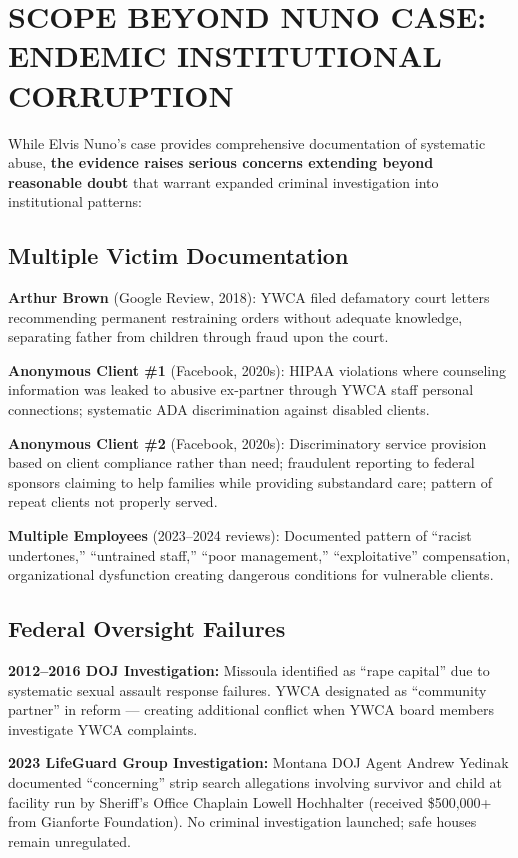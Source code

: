 \documentclass[12pt,oneside]{article}
\begin{document}
\section*{SCOPE BEYOND NUNO CASE: ENDEMIC INSTITUTIONAL CORRUPTION}

While Elvis Nuno's case provides comprehensive documentation of systematic abuse, \textbf{the evidence raises serious concerns extending beyond reasonable doubt} that warrant expanded criminal investigation into institutional patterns:

\subsection*{Multiple Victim Documentation}

\textbf{Arthur Brown} (Google Review, 2018): YWCA filed defamatory court letters recommending permanent restraining orders without adequate knowledge, separating father from children through fraud upon the court.

\textbf{Anonymous Client \#1} (Facebook, 2020s): HIPAA violations where counseling information was leaked to abusive ex-partner through YWCA staff personal connections; systematic ADA discrimination against disabled clients.

\textbf{Anonymous Client \#2} (Facebook, 2020s): Discriminatory service provision based on client compliance rather than need; fraudulent reporting to federal sponsors claiming to help families while providing substandard care; pattern of repeat clients not properly served.

\textbf{Multiple Employees} (2023--2024 reviews): Documented pattern of ``racist undertones,'' ``untrained staff,'' ``poor management,'' ``exploitative'' compensation, organizational dysfunction creating dangerous conditions for vulnerable clients.

\subsection*{Federal Oversight Failures}

\textbf{2012--2016 DOJ Investigation:} Missoula identified as ``rape capital'' due to systematic sexual assault response failures. YWCA designated as ``community partner'' in reform --- creating additional conflict when YWCA board members investigate YWCA complaints.

\textbf{2023 LifeGuard Group Investigation:} Montana DOJ Agent Andrew Yedinak documented ``concerning'' strip search allegations involving survivor and child at facility run by Sheriff's Office Chaplain Lowell Hochhalter (received \$500,000+ from Gianforte Foundation). No criminal investigation launched; safe houses remain unregulated.
\end{document}
